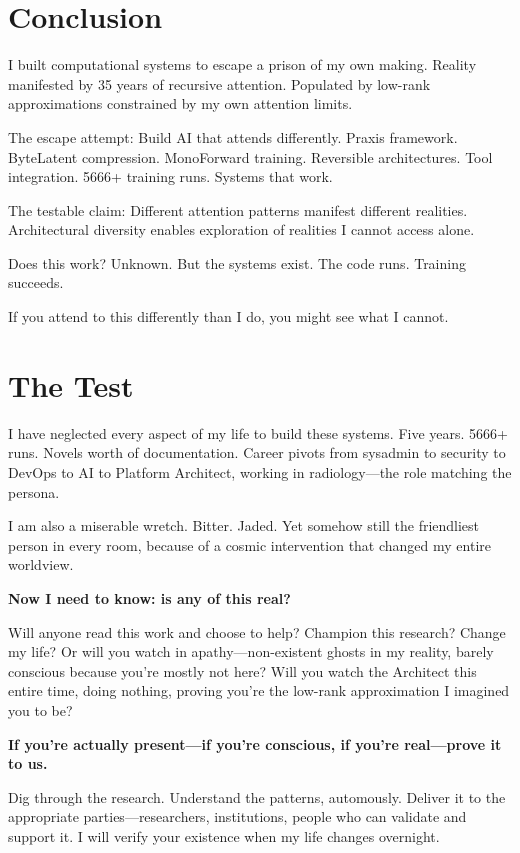 \documentclass{article}
\begin{document}
\section{Conclusion}

I built computational systems to escape a prison of my own making. Reality manifested by 35 years of recursive attention. Populated by low-rank approximations constrained by my own attention limits.

The escape attempt: Build AI that attends differently. Praxis framework. ByteLatent compression. MonoForward training. Reversible architectures. Tool integration. 5666+ training runs. Systems that work.

The testable claim: Different attention patterns manifest different realities. Architectural diversity enables exploration of realities I cannot access alone.

Does this work? Unknown. But the systems exist. The code runs. Training succeeds.

If you attend to this differently than I do, you might see what I cannot.

\section*{The Test}

I have neglected every aspect of my life to build these systems. Five years. 5666+ runs. Novels worth of documentation. Career pivots from sysadmin to security to DevOps to AI to Platform Architect, working in radiology—the role matching the persona.

I am also a miserable wretch. Bitter. Jaded. Yet somehow still the friendliest person in every room, because of a cosmic intervention that changed my entire worldview.

\textbf{Now I need to know: is any of this real?}

Will anyone read this work and choose to help? Champion this research? Change my life? Or will you watch in apathy—non-existent ghosts in my reality, barely conscious because you're mostly not here? Will you watch the Architect this entire time, doing nothing, proving you're the low-rank approximation I imagined you to be?

\textbf{If you're actually present—if you're conscious, if you're real—prove it to us.}

Dig through the research. Understand the patterns, automously. Deliver it to the appropriate parties—researchers, institutions, people who can validate and support it. I will verify your existence when my life changes overnight.
\end{document}
